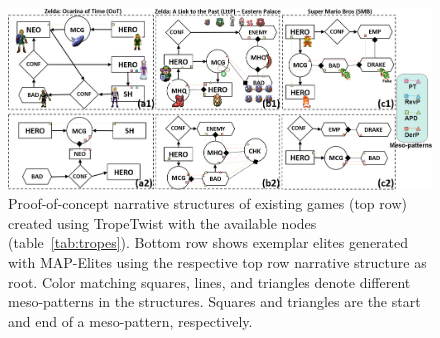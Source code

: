 

\begin{figure}
    \centering
    \includegraphics[width=\textwidth]{figures/figure-1_extra8.png}
       \caption{Proof-of-concept narrative structures of existing games (top row) created using TropeTwist with the available nodes (table~\ref{tab:tropes}). Bottom row shows exemplar elites generated with MAP-Elites using the respective top row narrative structure as root. Color matching squares, lines, and triangles denote different meso-patterns in the structures. Squares and triangles are the start and end of a meso-pattern, respectively.}
       \label{fig:teaserfig}
\end{figure}